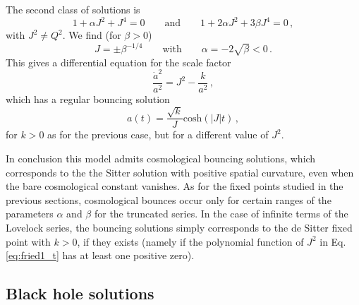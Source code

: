 \documentclass[aps,prd,preprint,nofootinbib]{revtex4-1}
\begin{document}
The second class of solutions is
    \begin{equation}
        1 + \alpha J^2 +  J^4 = 0 \qquad \text{and} \qquad 1+2 \alpha J^2 + 3 \beta J^4 = 0\,,
    \end{equation}
    with $J^2 \neq Q^2$. We find (for $\beta>0$)
    \begin{equation}
        J = \pm \beta^{-1/4} \qquad \text{with} \qquad \alpha = - 2\sqrt{\beta}<0\,.
    \end{equation}
    This gives a differential equation for the scale factor
    \begin{equation}
        \frac{\dot{a}^2}{a^2} = J^2 - \frac{k}{a^2}\,,
    \end{equation}
    which has a regular bouncing solution
    \begin{equation}
        a(t) = \frac{\sqrt{k}}{J} \text{cosh}\left(\left|J\right| t\right)\,,
    \end{equation}
    for $k>0$ as for the previous case, but for a different value of  $J^2$.


In conclusion this model admits cosmological bouncing solutions, which corresponds to the the Sitter solution with positive spatial curvature, even when the bare cosmological constant vanishes.
As for the fixed points studied in the previous sections, cosmological bounces occur only for certain ranges of the parameters $\alpha$ and $\beta$ for the truncated series. In the case of infinite terms of the Lovelock series, the bouncing solutions simply corresponds to the  de Sitter fixed point with $k>0$, if they exists (namely if the polynomial function of $J^2$ in Eq. \eqref{eq:fried1_t} has at least one positive zero).

\subsection{Black hole solutions}\label{sec:BHsol}
\end{document}
